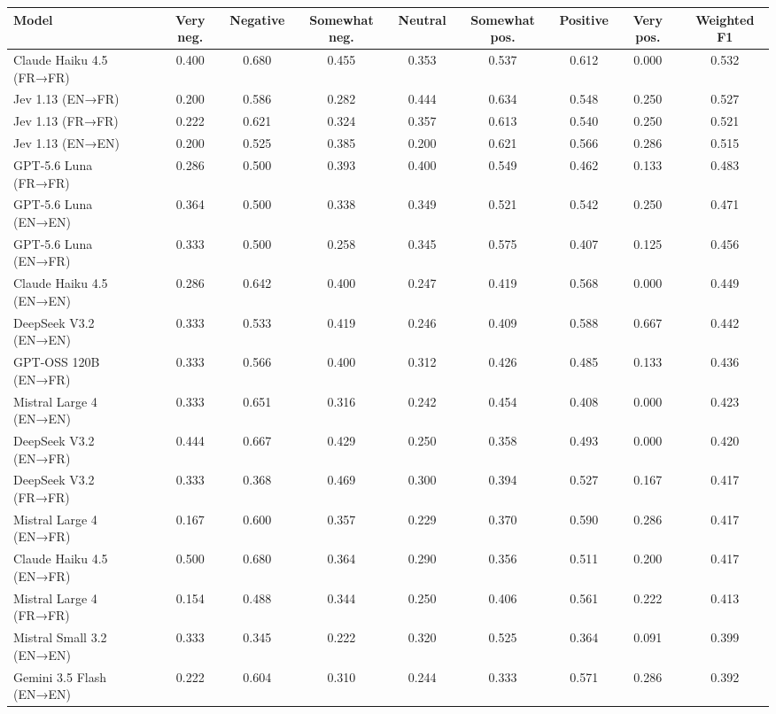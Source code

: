 \begin{tabular}{lcccccccc}
\hline
\textbf{Model} & \textbf{Very neg.} & \textbf{Negative} & \textbf{Somewhat neg.} & \textbf{Neutral} & \textbf{Somewhat pos.} & \textbf{Positive} & \textbf{Very pos.} & \textbf{Weighted F1} \\
\hline
Claude Haiku 4.5 (FR→FR) & 0.400 & 0.680 & 0.455 & 0.353 & 0.537 & 0.612 & 0.000 & 0.532 \\
Jev 1.13 (EN→FR) & 0.200 & 0.586 & 0.282 & 0.444 & 0.634 & 0.548 & 0.250 & 0.527 \\
Jev 1.13 (FR→FR) & 0.222 & 0.621 & 0.324 & 0.357 & 0.613 & 0.540 & 0.250 & 0.521 \\
Jev 1.13 (EN→EN) & 0.200 & 0.525 & 0.385 & 0.200 & 0.621 & 0.566 & 0.286 & 0.515 \\
GPT-5.6 Luna (FR→FR) & 0.286 & 0.500 & 0.393 & 0.400 & 0.549 & 0.462 & 0.133 & 0.483 \\
GPT-5.6 Luna (EN→EN) & 0.364 & 0.500 & 0.338 & 0.349 & 0.521 & 0.542 & 0.250 & 0.471 \\
GPT-5.6 Luna (EN→FR) & 0.333 & 0.500 & 0.258 & 0.345 & 0.575 & 0.407 & 0.125 & 0.456 \\
Claude Haiku 4.5 (EN→EN) & 0.286 & 0.642 & 0.400 & 0.247 & 0.419 & 0.568 & 0.000 & 0.449 \\
DeepSeek V3.2 (EN→EN) & 0.333 & 0.533 & 0.419 & 0.246 & 0.409 & 0.588 & 0.667 & 0.442 \\
GPT-OSS 120B (EN→FR) & 0.333 & 0.566 & 0.400 & 0.312 & 0.426 & 0.485 & 0.133 & 0.436 \\
Mistral Large 4 (EN→EN) & 0.333 & 0.651 & 0.316 & 0.242 & 0.454 & 0.408 & 0.000 & 0.423 \\
DeepSeek V3.2 (EN→FR) & 0.444 & 0.667 & 0.429 & 0.250 & 0.358 & 0.493 & 0.000 & 0.420 \\
DeepSeek V3.2 (FR→FR) & 0.333 & 0.368 & 0.469 & 0.300 & 0.394 & 0.527 & 0.167 & 0.417 \\
Mistral Large 4 (EN→FR) & 0.167 & 0.600 & 0.357 & 0.229 & 0.370 & 0.590 & 0.286 & 0.417 \\
Claude Haiku 4.5 (EN→FR) & 0.500 & 0.680 & 0.364 & 0.290 & 0.356 & 0.511 & 0.200 & 0.417 \\
Mistral Large 4 (FR→FR) & 0.154 & 0.488 & 0.344 & 0.250 & 0.406 & 0.561 & 0.222 & 0.413 \\
Mistral Small 3.2 (EN→EN) & 0.333 & 0.345 & 0.222 & 0.320 & 0.525 & 0.364 & 0.091 & 0.399 \\
Gemini 3.5 Flash (EN→EN) & 0.222 & 0.604 & 0.310 & 0.244 & 0.333 & 0.571 & 0.286 & 0.392 \\

\end{tabular}
